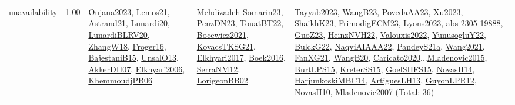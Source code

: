 {\begin{longtable}{p{3cm}r>{\raggedright\arraybackslash}p{6cm}>{\raggedright\arraybackslash}p{6cm}>{\raggedright\arraybackslash}p{8cm}}
\index{unavailability}\index{Concepts!unavailability}unavailability &  1.00 & \hyperref[detail:Oujana2023]{Oujana2023}, \hyperref[detail:Lemos21]{Lemos21}, \hyperref[detail:Astrand21]{Astrand21}, \hyperref[detail:Lunardi20]{Lunardi20}, \hyperref[detail:LunardiBLRV20]{LunardiBLRV20}, \hyperref[detail:ZhangW18]{ZhangW18}, \hyperref[detail:Froger16]{Froger16}, \hyperref[detail:BajestaniB15]{BajestaniB15}, \hyperref[detail:UnsalO13]{UnsalO13}, \hyperref[detail:AkkerDH07]{AkkerDH07}, \hyperref[detail:Elkhyari2006]{Elkhyari2006}, \hyperref[detail:KhemmoudjPB06]{KhemmoudjPB06} & \hyperref[detail:Mehdizadeh-Somarin23]{Mehdizadeh-Somarin23}, \hyperref[detail:PenzDN23]{PenzDN23}, \hyperref[detail:TouatBT22]{TouatBT22}, \hyperref[detail:Bocewicz2021]{Bocewicz2021}, \hyperref[detail:KovacsTKSG21]{KovacsTKSG21}, \hyperref[detail:Elkhyari2017]{Elkhyari2017}, \hyperref[detail:Boek2016]{Boek2016}, \hyperref[detail:SerraNM12]{SerraNM12}, \hyperref[detail:LorigeonBB02]{LorigeonBB02} & \hyperref[detail:Tayyab2023]{Tayyab2023}, \hyperref[detail:WangB23]{WangB23}, \hyperref[detail:PovedaAA23]{PovedaAA23}, \hyperref[detail:Xu2023]{Xu2023}, \hyperref[detail:ShaikhK23]{ShaikhK23}, \hyperref[detail:FrimodigECM23]{FrimodigECM23}, \hyperref[detail:Lyons2023]{Lyons2023}, \hyperref[detail:abs-2305-19888]{abs-2305-19888}, \hyperref[detail:GuoZ23]{GuoZ23}, \hyperref[detail:HeinzNVH22]{HeinzNVH22}, \hyperref[detail:Valouxis2022]{Valouxis2022}, \hyperref[detail:YunusogluY22]{YunusogluY22}, \hyperref[detail:BulckG22]{BulckG22}, \hyperref[detail:NaqviAIAAA22]{NaqviAIAAA22}, \hyperref[detail:PandeyS21a]{PandeyS21a}, \hyperref[detail:Wang2021]{Wang2021}, \hyperref[detail:FanXG21]{FanXG21}, \hyperref[detail:WangB20]{WangB20}, \hyperref[detail:Caricato2020]{Caricato2020}...\hyperref[detail:Mladenovic2015]{Mladenovic2015}, \hyperref[detail:BurtLPS15]{BurtLPS15}, \hyperref[detail:KreterSS15]{KreterSS15}, \hyperref[detail:GoelSHFS15]{GoelSHFS15}, \hyperref[detail:NovasH14]{NovasH14}, \hyperref[detail:HarjunkoskiMBC14]{HarjunkoskiMBC14}, \hyperref[detail:ArtiguesLH13]{ArtiguesLH13}, \hyperref[detail:GuyonLPR12]{GuyonLPR12}, \hyperref[detail:NovasH10]{NovasH10}, \hyperref[detail:Mladenovic2007]{Mladenovic2007} (Total: 36)\\
\end{longtable}
}

\clearpage
